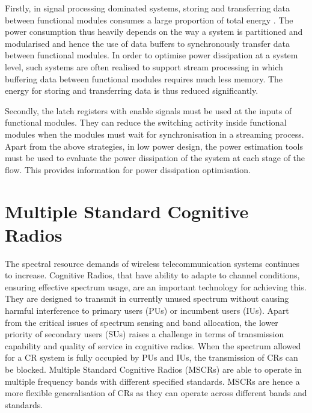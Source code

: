 Firstly, in signal processing dominated systems, storing and transferring data between functional modules consumes a large proportion of total energy \cite{Liu2009}.
The power consumption thus heavily depends on the way a system is partitioned and modularised and hence the use of data buffers to synchronously transfer data between functional modules.
In order to optimise power dissipation at a system level, such systems are often realised to support stream processing in which buffering data between functional modules requires much less memory.
The energy for storing and transferring data is thus reduced significantly.

Secondly, the latch registers with enable signals must be used at the inputs of functional modules.
They can reduce the switching activity inside functional modules when the modules must wait for synchronisation in a streaming process.
Apart from the above strategies, in low power design, the power estimation tools must be used to evaluate the power dissipation of the system at each stage of the flow. 
This provides information for power dissipation optimisation. 

\section{Multiple Standard Cognitive Radios}

The spectral resource demands of wireless telecommunication systems continues to increase. 
Cognitive Radios, that have ability to adapte to channel conditions, ensuring effective spectrum usage, are an important technology for achieving this. 
They are designed to transmit in currently unused spectrum without causing harmful interference to primary users (PUs) or incumbent users (IUs).
Apart from the critical issues of spectrum sensing and band allocation, the lower priority of secondary users (SUs) raises a challenge in terms of transmission capability and quality of service in cognitive radios. 
When the spectrum allowed for a CR system is fully occupied by PUs and IUs, the transmission of CRs can be blocked. 
Multiple Standard Cognitive Radios (MSCRs) are able to operate in multiple frequency bands with different specified standards.
MSCRs are hence a more flexible generalisation of CRs as they can operate across different bands and standards.

